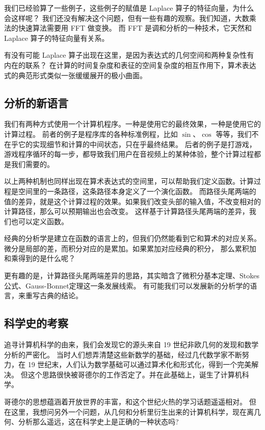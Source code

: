 \documentclass[a4paper,12pt]{article}
\numberwithin{definition}{section}
\numberwithin{lemma}{section}
\numberwithin{proposition}{section}
\numberwithin{theorem}{section}
\numberwithin{grammar}{section}
\numberwithin{program}{section}
\numberwithin{convention}{section}
\numberwithin{corollary}{section}
\begin{document}
我们已经验算了一些例子，这些例子的赋值是 Laplace 算子的特征向量，为什么会这样呢？
我们还没有解决这个问题，但有一些有趣的观察。我们知道，大数乘法的快速算法需要用 FFT 做变换。
而 FFT 是调和分析的一种技术，它天然和 Laplace 算子的特征向量有关系。

有没有可能 Laplace 算子出现在这里，是因为表达式的几何空间和两种复杂性有内在的联系？
在计算的时间复杂度和表征的空间复杂度的相互作用下，算术表达式的典范形式类似一张缓缓展开的极小曲面。

\subsection{分析的新语言}

我们有两种方式使用一个计算机程序。一种是使用它的最终效果，一种是使用它的计算过程。
前者的例子是程序库的各种标准例程，比如 $\sin$、$\cos$ 等等，我们不在乎它的实现细节和计算的中间状态，只在乎最终结果。
后者的例子是打游戏，游戏程序循环的每一步，都导致我们用户在音视频上的某种体验，整个计算过程都是我们需要的。

以上两种机制也同样出现在算术表达式的空间里，可以帮助我们定义函数。计算过程是空间里的一条路径，这条路径本身定义了一个演化函数。
而路径头尾两端的值的差异，就是这个计算过程的效果。如果我们改变头部的输入值，不改变相对的计算路径，那么可以预期输出也会改变。
这样基于计算路径头尾两端的差异，我们也可以定义函数。

经典的分析学是建立在函数的语言上的，但我们仍然能看到它和算术的对应关系。微分是局部的差，而积分对应的是累加。如果累加对应经典的积分，
那么累积加和乘得到的是什么呢？

更有趣的是，计算路径头尾两端差异的思路，其实暗含了微积分基本定理、Stokes公式、Gauss-Bonnet定理这一条发展线索。
有可能我们可以发展新的分析学的语言，来重写古典的结论。

\subsection{科学史的考察}

追寻计算机科学的由来，我们会发现它的源头来自 19 世纪非欧几何的发现和数学分析的严密化。
当时人们想弄清楚这些新数学的基础，经过几代数学家不断努力，在 19 世纪末，人们认为数学基础可以通过算术化和形式化，得到一个完美解决。
但这个思路很快被哥德尔的工作否定了。并在此基础上，诞生了计算机科学。

哥德尔的思想蕴涵着开放世界的丰富，和这个世纪火热的学习话题遥遥相对。
但在这里，我想问另外一个问题，从几何和分析里衍生出来的计算机科学，现在离几何、分析那么遥远，这在科学史上是正确的一种状态吗?
\end{document}
